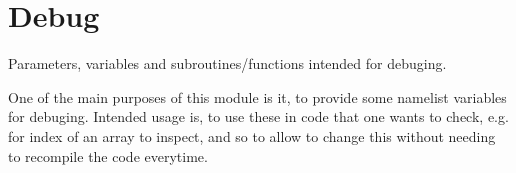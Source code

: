 \section{Debug}
Parameters, variables and subroutines/functions intended for debuging.

One of the main purposes of this module is it, to provide some namelist
variables for debuging.
Intended usage is, to use these in code that one wants to check, e.g.
for index of an array to inspect, and so to allow to change this without
needing to recompile the code everytime.
